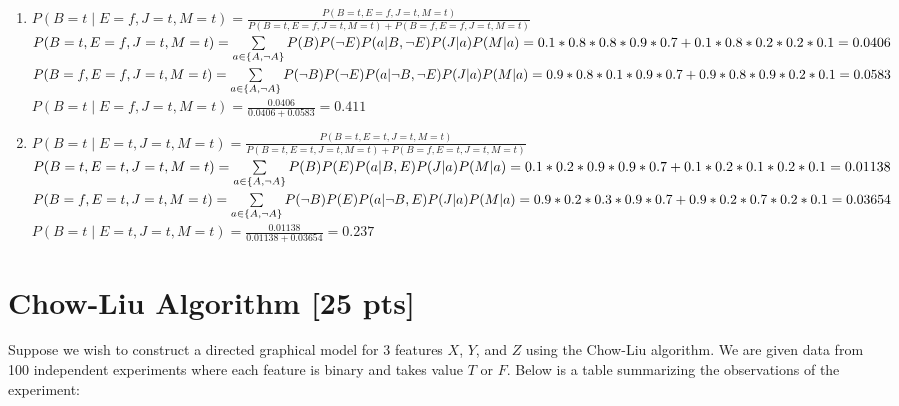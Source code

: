 \documentclass[a4paper]{article}
\theoremstyle{definition}
\newenvironment{soln}{
	\leavevmode\color{blue}\ignorespaces
}{}
\begin{document}
\begin{soln}
	\begin{enumerate}
		\item $P(B=t \mid E=f, J=t, M=t) = \frac{P(B=t, E=f, J=t, M=t)}{P(B=t, E=f, J=t, M=t) + P(B=f, E=f, J=t, M=t)}$ \\

			$P(B = t, E = f, J = t, M = t) = 
			\sum\limits_{a \in \{A, \neg A\}} P(B)P(\neg E)P(a | B,\neg E)P(J | a)P(M | a) \\
			= 0.1 * 0.8 * 0.8 * 0.9 * 0.7 + 0.1 * 0.8 * 0.2 * 0.2 * 0.1 = 0.0406$ \\
			
			$P(B=f, E=f, J=t, M=t) = \sum\limits_{a \in \{A, \neg A\}} P(\neg B)P(\neg E)P(a |\neg B,\neg E)P(J | a)P(M | a) \\
			= 0.9 * 0.8 * 0.1 * 0.9 * 0.7 + 0.9 * 0.8 * 0.9 * 0.2 * 0.1  = 0.0583$ \\
		
			$P(B=t \mid E=f, J=t, M=t) = \frac{0.0406}{0.0406 + 0.0583} = 0.411$ \\
		
		\item $P(B=t \mid E=t, J=t, M=t) = \frac{P(B=t, E=t, J=t, M=t)}{P(B=t, E=t, J=t, M=t) + P(B=f, E=t, J=t, M=t)}$ \\
						
			$P(B = t, E = t, J = t, M = t) = 
			\sum\limits_{a \in \{A, \neg A\}} P(B)P(E)P(a | B,E)P(J | a)P(M | a) \\
			= 0.1 * 0.2 * 0.9 * 0.9 * 0.7 + 0.1 * 0.2 * 0.1 * 0.2 * 0.1 = 0.01138$ \\
			
			$P(B=f, E=t, J=t, M=t) = \sum\limits_{a \in \{A, \neg A\}} P(\neg B)P(E)P(a |\neg B,E)P(J | a)P(M | a) \\
			= 0.9 * 0.2 * 0.3 * 0.9 * 0.7 + 0.9 * 0.2 * 0.7 * 0.2 * 0.1  = 0.03654$ \\
		
			$P(B=t \mid E=t, J=t, M=t) = \frac{0.01138}{0.01138 + 0.03654} = 0.237$ \\
	\end{enumerate}
	
	
\end{soln}


\section{Chow-Liu Algorithm [25 pts]}
Suppose we wish to construct a directed graphical model for 3 features $X$, $Y$, and $Z$ using the Chow-Liu algorithm. We are given data from 100 independent experiments where each feature is binary and takes value $T$ or $F$. Below is a table summarizing the observations of the experiment:
\end{document}

